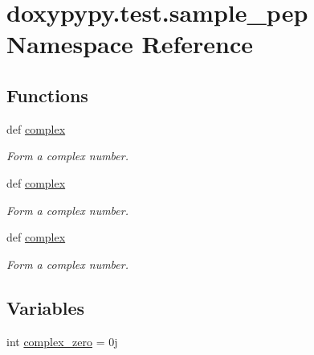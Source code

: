 \hypertarget{namespacedoxypypy_1_1test_1_1sample__pep}{\section{doxypypy.\-test.\-sample\-\_\-pep Namespace Reference}
\label{namespacedoxypypy_1_1test_1_1sample__pep}
}
\subsection*{Functions}
\begin{DoxyCompactItemize}
\item 
def \hyperlink{namespacedoxypypy_1_1test_1_1sample__pep_ad980433a60e14e065c85e341ec2c5ee9}{complex}
\begin{DoxyCompactList}\small\item\em Form a complex number. \end{DoxyCompactList}\item 
def \hyperlink{namespacedoxypypy_1_1test_1_1sample__pep_ad980433a60e14e065c85e341ec2c5ee9}{complex}
\begin{DoxyCompactList}\small\item\em Form a complex number. \end{DoxyCompactList}\item 
def \hyperlink{namespacedoxypypy_1_1test_1_1sample__pep_adbaf7a3186c446e5df96160e7ec21f73}{complex}
\begin{DoxyCompactList}\small\item\em Form a complex number. \end{DoxyCompactList}\end{DoxyCompactItemize}
\subsection*{Variables}
\begin{DoxyCompactItemize}
\item 
int \hyperlink{namespacedoxypypy_1_1test_1_1sample__pep_a621dca165a08284e00f78c187ddbb0db}{complex\-\_\-zero} = 0j
\end{DoxyCompactItemize}


